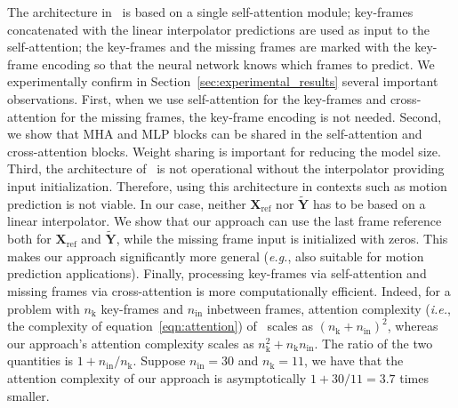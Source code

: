 \documentclass[letterpaper]{article} \usepackage[]{aaai23}  \usepackage{times}  \usepackage{helvet}  \usepackage{courier}  \usepackage[hyphens]{url}  \usepackage{graphicx} \urlstyle{rm} \def\UrlFont{\rm}  \usepackage{natbib}  \usepackage{caption} \frenchspacing  \setlength{\pdfpagewidth}{8.5in} \setlength{\pdfpageheight}{11in}
\renewcommand{\vec}[1]{\mathbf{#1}}
\begin{document}
The architecture in~\cite{duan2021singleshot} is based on a single self-attention module; key-frames concatenated with the linear interpolator predictions are used as input to the self-attention; the key-frames and the missing frames are marked with the key-frame encoding so that the neural network knows which frames to predict. We experimentally confirm in Section~\ref{sec:experimental_results} several important observations. First, when we use self-attention for the key-frames and cross-attention for the missing frames, the key-frame encoding is not needed. Second, we show that MHA and MLP blocks can be shared in the self-attention and cross-attention blocks. Weight sharing is important for reducing the model size. Third, the architecture of~\citet{duan2021singleshot} is not operational without the interpolator providing input initialization. Therefore, using this architecture in contexts such as motion prediction is not viable. In our case, neither $\vec{X}_{\textrm{ref}}$ nor $\widetilde{\vec{Y}}$ has to be based on a linear interpolator. We show that our approach can use the last frame reference both for $\vec{X}_{\textrm{ref}}$ and $\widetilde{\vec{Y}}$, while the missing frame input is initialized with zeros. This makes our approach significantly more general (\emph{e.g.}, also suitable for motion prediction applications). Finally, processing key-frames via self-attention and missing frames via cross-attention is more computationally efficient. Indeed, for a problem with $n_{\textrm{k}}$ key-frames and $n_{\textrm{in}}$ inbetween frames, attention complexity (\emph{i.e.}, the complexity of equation~\eqref{eqn:attention}) of~\cite{duan2021singleshot} scales as $(n_{\textrm{k}} + n_{\textrm{in}})^2$, whereas our approach's attention complexity scales as $n_{\textrm{k}}^2 + n_{\textrm{k}} n_{\textrm{in}}$. The ratio of the two quantities is $1 + n_{\textrm{in}} / n_{\textrm{k}}$. Suppose $n_{\textrm{in}} = 30$ and $n_{\textrm{k}} = 11$, we have that the attention complexity of our approach is asymptotically $1 + 30/11 = 3.7$ times smaller.
\end{document}
